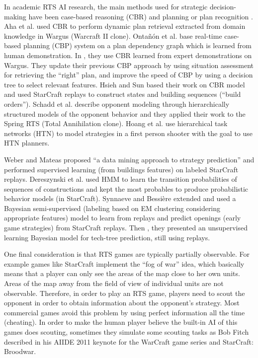 \documentclass[journal]{IEEEtran}
\begin{document}
In academic RTS AI research, the main methods used for strategic decision-making have been case-based reasoning (CBR) and planning or plan recognition \cite{LTW,CBR_Planning,OntanonCBR,HTNPlanning,Ramirez}. Aha et al. \cite{LTW} used CBR to perform dynamic plan retrieval extracted from domain knowledge in Wargus (Warcraft II clone). Onta\~{n}\'{o}n et al. \cite{CBR_Planning} base real-time case-based planning (CBP) system on a plan dependency graph which is learned from human demonstration. In \cite{OntanonCBR,PlanRetrieval}, they use CBR learned from expert demonstrations on Wargus. They update their previous CBP approach by using situation assessment for retrieving the ``right'' plan, and improve the speed of CBP by using a decision tree to select relevant features. Hsieh and Sun \cite{HsiehS08} based their work on \cite{LTW} CBR model and used StarCraft replays to construct states and building sequences (``build orders''). Schadd et al. \cite{SchaddBS07} describe opponent modeling through hierarchically structured models of the opponent behavior and they applied their work to the Spring RTS (Total Annihilation clone). Hoang et al. \cite{HTNPlanning} use hierarchical task networks (HTN) to model strategies in a first person shooter with the goal to use HTN planners. %

Weber and Mateas \cite{WeberCig09} proposed ``a data mining approach to strategy prediction'' and performed supervised learning (from buildings features) on labeled StarCraft replays. Dereszynski et al. \cite{HMMstrat_RTS_AIIDE11} used HMM to learn the transition probabilities of sequences of constructions and kept the most probables to produce probabilistic behavior models (in StarCraft). Synnaeve and Bessi\`{e}re \cite{SynnaeveOpeningCig11} extended \cite{WeberCig09} and used a Bayesian semi-supervised (labeling based on EM clustering considering appropriate features) model to learn from replays and predict openings (early game strategies) from StarCraft replays. Then \cite{SynnaeveAIIDE11}, they presented an unsupervised learning Bayesian model for tech-tree prediction, still using replays.

One final consideration is that RTS games are typically partially observable. For example games like StarCraft implement the ``fog of war'' idea, which basically means that a player can only see the areas of the map close to her own units. Areas of the map away from the field of view of individual units are not observable. Therefore, in order to play an RTS game, players need to scout the opponent in order to obtain information about the opponent's strategy. Most commercial games avoid this problem by using perfect information all the time (cheating). In order to make the human player believe the built-in AI of this games does scouting, sometimes they simulate some scouting tasks as Bob Fitch described in his AIIDE 2011 keynote for the WarCraft game series and StarCraft: Broodwar. %
\end{document}
